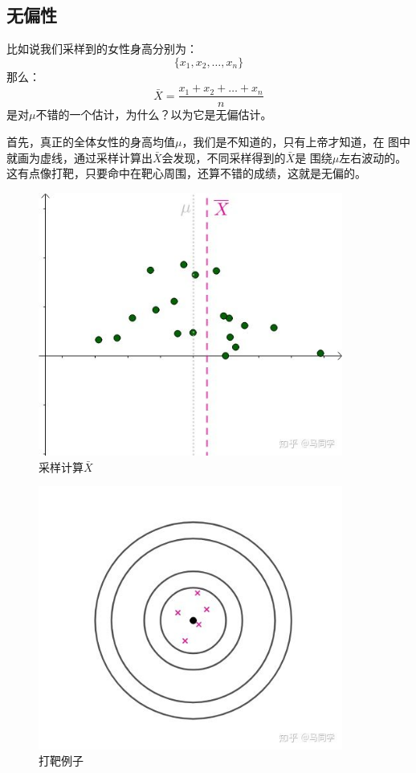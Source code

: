 \documentclass{article}
\begin{document}
\subsection{无偏性}
比如说我们采样到的女性身高分别为：
\begin{equation}
\{x_1,x_2,\dots,x_n\}
\end{equation}
那么：
\begin{equation}
\bar{X}=\frac{x_1+x_2+\dots+x_n}{n}
\end{equation}
是对$\mu$不错的一个估计，为什么？以为它是无偏估计。\par
首先，真正的全体女性的身高均值$\mu$，我们是不知道的，只有上帝才知道，在
图中就画为虚线，通过采样计算出$\bar{X}$会发现，不同采样得到的$\bar{X}$是
围绕$\mu$左右波动的。这有点像打靶，只要命中在靶心周围，还算不错的成绩，这就是无偏的。
\begin{figure}[!hbp]
    \centering
    \includegraphics[width=10cm]{figure2.jpg}
    \caption{采样计算$\bar{X}$}
\end{figure}

\begin{figure}
    \centering
    \includegraphics[width=10cm]{figure3.jpg}
    \caption{打靶例子}
\end{figure}
\end{document}
